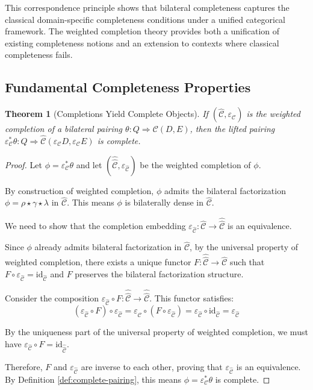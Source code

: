 \documentclass[11pt]{article}
\theoremstyle{plain}
\newtheorem{theorem}{Theorem}[section]
\theoremstyle{definition}
\theoremstyle{remark}
\newcommand{\C}{\mathcal{C}}
\newcommand{\id}{\mathrm{id}}
\newcommand{\wh}[1]{\widehat{#1}}
\begin{document}
This correspondence principle shows that bilateral completeness captures the classical domain-specific completeness conditions under a unified categorical framework. The weighted completion theory provides both a unification of existing completeness notions and an extension to contexts where classical completeness fails.

\subsection{Fundamental Completeness Properties}

\begin{theorem}[Completions Yield Complete Objects]\label{thm:completions-are-complete}
If $(\wh{\C}, \varepsilon_\C)$ is the weighted completion of a bilateral pairing $\theta : Q \Rightarrow \C(D, E)$, then the lifted pairing $\varepsilon_\C^* \theta : Q \Rightarrow \wh{\C}(\varepsilon_\C D, \varepsilon_\C E)$ is complete.
\end{theorem}

\begin{proof}
Let $\phi = \varepsilon_\C^* \theta$ and let $(\wh{\wh{\C}}, \varepsilon_{\wh{\C}})$ be the weighted completion of $\phi$.

By construction of weighted completion, $\phi$ admits the bilateral factorization $\phi = \rho \star \gamma \star \lambda$ in $\wh{\C}$. This means $\phi$ is bilaterally dense in $\wh{\C}$.

We need to show that the completion embedding $\varepsilon_{\wh{\C}} : \wh{\C} \to \wh{\wh{\C}}$ is an equivalence.

Since $\phi$ already admits bilateral factorization in $\wh{\C}$, by the universal property of weighted completion, there exists a unique functor $F : \wh{\wh{\C}} \to \wh{\C}$ such that $F \circ \varepsilon_{\wh{\C}} = \id_{\wh{\C}}$ and $F$ preserves the bilateral factorization structure.

Consider the composition $\varepsilon_{\wh{\C}} \circ F : \wh{\wh{\C}} \to \wh{\wh{\C}}$. This functor satisfies:
$$(\varepsilon_{\wh{\C}} \circ F) \circ \varepsilon_{\wh{\C}} = \varepsilon_{\wh{\C}} \circ (F \circ \varepsilon_{\wh{\C}}) = \varepsilon_{\wh{\C}} \circ \id_{\wh{\C}} = \varepsilon_{\wh{\C}}$$

By the uniqueness part of the universal property of weighted completion, we must have $\varepsilon_{\wh{\C}} \circ F = \id_{\wh{\wh{\C}}}$.

Therefore, $F$ and $\varepsilon_{\wh{\C}}$ are inverse to each other, proving that $\varepsilon_{\wh{\C}}$ is an equivalence. By Definition \ref{def:complete-pairing}, this means $\phi = \varepsilon_\C^* \theta$ is complete.
\end{proof}
\end{document}
